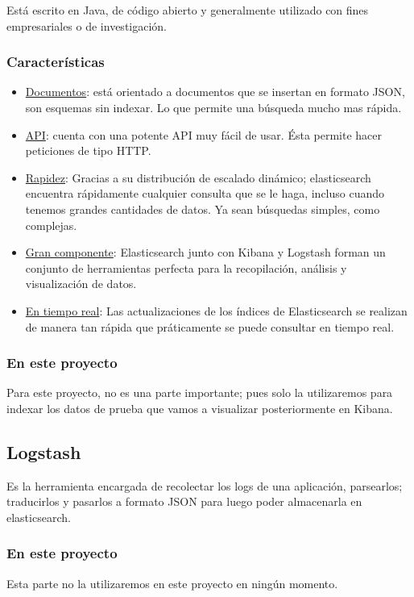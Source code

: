 \documentclass[a4paper, 12pt]{book}
\begin{document}
Está escrito en Java, de código abierto y generalmente utilizado con fines empresariales o de investigación.
\subsubsection{Características}
\begin{itemize}
\item \underline{Documentos}: está orientado a documentos que se insertan en formato JSON, son esquemas sin indexar. Lo que permite una búsqueda mucho mas rápida.
\item \underline{API}: cuenta con una potente API muy fácil de usar. Ésta permite hacer peticiones de tipo HTTP.
\item \underline{Rapidez}: Gracias a su distribución de escalado dinámico; elasticsearch encuentra rápidamente cualquier consulta que se le haga, incluso cuando tenemos grandes cantidades de datos. Ya sean búsquedas simples, como complejas.
\item \underline{Gran componente}: Elasticsearch junto con Kibana y Logstash forman un conjunto de herramientas perfecta para la recopilación, análisis y visualización de datos.
\item \underline{En tiempo real}: Las actualizaciones de los índices de Elasticsearch se realizan de manera tan rápida que práticamente se puede consultar en tiempo real.
\end{itemize}
\subsubsection{En este proyecto}
Para este proyecto, no es una parte importante; pues solo la utilizaremos para indexar los datos de prueba que vamos a visualizar posteriormente en Kibana.


\subsection{Logstash}
Es la herramienta encargada de recolectar los logs de una aplicación, parsearlos; traducirlos y pasarlos a formato JSON para luego poder almacenarla en elasticsearch. 

\subsubsection{En este proyecto}
Esta parte no la utilizaremos en este proyecto en ningún momento.

\end{document}
